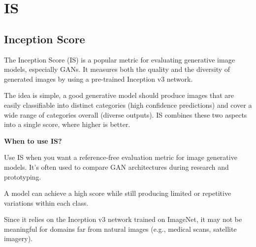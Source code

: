 \clearpage
\thispagestyle{genaistyle}
\section{IS}
\subsection{Inception Score}

The Inception Score (IS) is a popular metric for evaluating generative image models, especially GANs. It measures both the quality and the
diversity of generated images by using a pre-trained Inception v3 network.

\begin{center}
\end{center}

The idea is simple, a good generative model should produce images that are easily classifiable into distinct categories (high confidence
predictions) and cover a wide range of categories overall (diverse outputs). IS combines these two aspects into a single score,
where higher is better.

\textbf{When to use IS?}

Use IS when you want a reference-free evaluation metric for image generative models.
It’s often used to compare GAN architectures during research and prototyping.


{
\item A model can achieve a high score while still producing limited or repetitive variations within each class.
\item Since it relies on the Inception v3 network trained on ImageNet, it may not be meaningful for domains far from natural
images (e.g., medical scans, satellite imagery).
}

